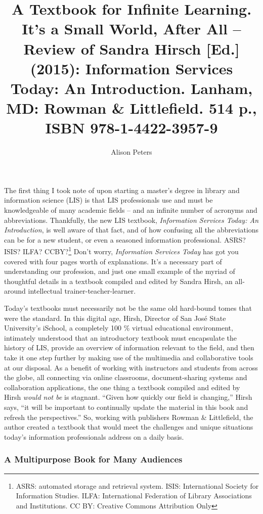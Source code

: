 \documentclass[a4paper,
fontsize=11pt,
oneside,
numbers=noperiodatend,
parskip=half-,
bibliography=totoc,
final
]{scrartcl}
\title{\LARGE{A Textbook for Infinite Learning. It’s a Small World, After All – Review of Sandra Hirsch [Ed.] (2015): Information Services Today: An Introduction. Lanham, MD: Rowman \& Littlefield. 514 p., ISBN 978-1-4422-3957-9}} %
\author{Alison Peters} %
\date{}
\begin{document}
\maketitle
\thispagestyle{fancyplain} 


The first thing I took note of upon starting a master's degree in
library and information science (LIS) is that LIS professionals use and
must be knowledgeable of many academic fields -- and an infinite number
of acronyms and abbreviations. Thankfully, the new LIS textbook,
\emph{Information Services Today: An Introduction}, is well aware of
that fact, and of how confusing all the abbreviations can be for a new
student, or even a seasoned information professional. ASRS? ISIS? ILFA?
CCBY?\footnote{ASRS: automated storage and retrieval system. ISIS:
  International Society for Information Studies. ILFA: International
  Federation of Library Associations and Institutions. CC BY: Creative
  Commons Attribution Only} Don't worry, \emph{Information Services
Today} has got you covered with four pages worth of explanations. It's a
necessary part of understanding our profession, and just one small
example of the myriad of thoughtful details in a textbook compiled and
edited by Sandra Hirsh, an all-around intellectual
trainer-teacher-learner.

Today's textbooks must necessarily not be the same old hard-bound tomes
that were the standard. In this digital age, Hirsh, Director of San José
State University's iSchool, a completely 100 \% virtual educational
environment, intimately understood that an introductory textbook must
encapsulate the history of LIS, provide an overview of information
relevant to the field, and then take it one step further by making use
of the multimedia and collaborative tools at our disposal. As a benefit
of working with instructors and students from across the globe, all
connecting via online classrooms, document-sharing systems and
collaboration applications, the one thing a textbook compiled and edited
by Hirsh \emph{would not be} is stagnant. \enquote{Given how quickly our
field is changing,} Hirsh says, \enquote{it will be important to
continually update the material in this book and refresh the
perspectives.} So, working with publishers Rowman \& Littlefield, the
author created a textbook that would meet the challenges and unique
situations today's information professionals address on a daily basis.

\subsubsection{A Multipurpose Book for Many
Audiences}\label{a-multipurpose-book-for-many-audiences}
\end{document}
